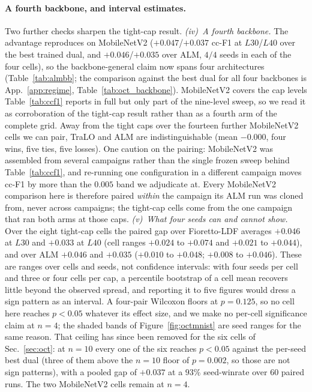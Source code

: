 \documentclass[10pt]{article}
\begin{document}
{
\paragraph{A fourth backbone, and interval estimates.}
Two further checks sharpen the tight-cap result. \emph{(iv)~A fourth
backbone.} The advantage reproduces on MobileNetV2 ($+0.047$/$+0.037$ cc-F1 at
$L30$/$L40$ over the best trained dual, and $+0.046$/$+0.035$ over ALM, $4/4$
seeds in each of the four cells), so the backbone-general claim now spans four
architectures (Table~\ref{tab:almbb}; the comparison against the best dual for
all four backbones is App.~\ref{app:regime},
Table~\ref{tab:oct_backbone}). MobileNetV2 covers the cap levels
Table~\ref{tab:ccf1} reports in full but only part of the nine-level sweep, so we
read it as corroboration of the tight-cap result rather than as a fourth arm of
the complete grid. Away from the tight caps {over} the fourteen further MobileNetV2 cells we can pair, TraLO
and ALM are indistinguishable (mean $-0.000$, four wins, five ties, five losses).
{One caution on the pairing: MobileNetV2} was assembled from several
campaigns rather than the single frozen sweep behind
Table~\ref{tab:ccf1}, and re-running one configuration in a different campaign
moves cc-F1 by more than the $0.005$ band we adjudicate at. Every MobileNetV2
comparison here is therefore paired \emph{within} the campaign its ALM run was
cloned from, never across campaigns; the tight-cap cells come from the one
campaign that ran both arms at those caps. \emph{(v)~What four seeds can and
cannot show.} Over the eight tight-cap cells the paired gap over Fioretto-LDF
averages $+0.046$ at $L30$ and $+0.033$ at $L40$ (cell ranges $+0.024$ to
$+0.074$ and $+0.021$ to $+0.044$), and over ALM $+0.046$ and $+0.035$ ($+0.010$
to $+0.048$; $+0.008$ to $+0.046$). These are ranges over cells and seeds, not
confidence intervals{: with four seeds per cell and three or
four cells per cap, a percentile bootstrap of a cell mean recovers little beyond
the observed spread, and reporting it to five figures would dress a sign pattern
as an interval.} {A four-pair Wilcoxon floors at
$p{=}0.125$, so no cell here reaches $p<0.05$ whatever its effect size, and we make
no per-cell significance claim at $n{=}4$; the shaded bands of
Figure~\ref{fig:octmnist} are seed ranges for the same reason.} That ceiling has since been removed for the six cells
of Sec.~\ref{sec:oct}{: at} $n{=}10$ every one of the
six reaches $p<0.05$ against the per-seed best dual (three of them above the $n{=}10$
floor of $p{=}0.002$, so those are not sign patterns), with a pooled gap of $+0.037$ at a
$93\%$ seed-winrate over $60$ paired runs. The two MobileNetV2 cells remain at $n{=}4$.}
\end{document}

